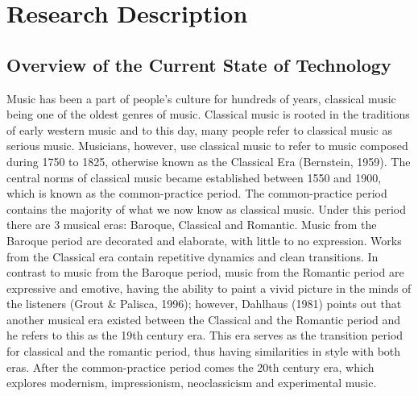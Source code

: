 %
%
%                 

\chapter{Research Description}
\label{sec:researchdesc}    %

\section{Overview of the Current State of Technology}
\label{sec:overview}
	Music has been a part of people’s culture for hundreds of years, classical music being one of the oldest genres of music. Classical music is rooted in the traditions of early western music and to this day, many people refer to classical music as serious music. Musicians, however, use classical music to refer to music composed during 1750 to 1825, otherwise known as the Classical Era (Bernstein, 1959). The central norms of classical music became established between 1550 and 1900, which is known as the common-practice period. The common-practice period contains the majority of what we now know as classical music. Under this period there are 3 musical eras: Baroque, Classical and Romantic. Music from the Baroque period are decorated and elaborate, with little to no expression. Works from the Classical era contain repetitive dynamics and clean transitions. In contrast to music from the Baroque period, music from the Romantic period are expressive and emotive, having the ability to paint a vivid picture in the minds of the listeners (Grout \& Palisca, 1996); however, Dahlhaus (1981) points out that another musical era existed between the Classical and the Romantic period and he refers to this as the 19th century era. This era serves as the transition period for classical and the romantic period, thus having similarities in style with both eras. After the common-practice period comes the 20th century era, which explores modernism, impressionism, neoclassicism and experimental music. 

